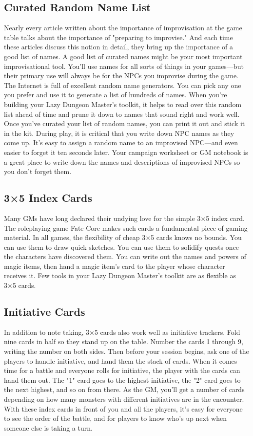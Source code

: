 \documentclass[10pt,a4paper,twoside,bg=print,twocolumn,openany,nodeprecatedcode]{dndbook}
\begin{document}
\subsection{Curated Random Name List}
Nearly every article written about the importance of improvisation at the game table talks about the importance of "preparing to improvise." And each time these articles discuss this notion in detail, they bring up the importance of a good list of names.
A good list of curated names might be your most important improvisational tool.
You'll use names for all sorts of things in your games—but their primary use will always be for the NPCs you improvise during the game. The Internet is full of excellent random name generators. You can pick any one you prefer and use it to generate a list of hundreds of names. When you're building your Lazy Dungeon Master's toolkit, it helps to read over this random list ahead of time and prune it down to names that sound right and work well. Once you've curated your list of random names, you can print it out and stick it in the kit.
During play, it is critical that you write down NPC names as they come up. It's easy to assign a random name to an improvised NPC—and even easier to forget it ten seconds later. Your campaign worksheet or GM notebook is a great place to write down the names and descriptions of improvised NPCs so you don't forget them.
\subsection{3×5 Index Cards}
Many GMs have long declared their undying love for the simple 3×5 index card. The roleplaying game Fate Core makes such cards a fundamental piece of gaming material. In all games, the flexibility of cheap 3×5 cards knows no bounds. You can use them to draw quick sketches. You can use them to solidify quests once the characters have discovered them. You can write out the names and powers of magic items, then hand a magic item's card to the player whose character receives it.
Few tools in your Lazy Dungeon Master's toolkit are as flexible as 3×5 cards.
\subsection{Initiative Cards}
In addition to note taking, 3×5 cards also work well as initiative trackers. Fold nine cards in half so they stand up on the table. Number the cards 1 through 9, writing the number on both sides. Then before your session begins, ask one of the players to handle initiative, and hand them the stack of cards.
When it comes time for a battle and everyone rolls for initiative, the player with the cards can hand them out. The "1" card goes to the highest initiative, the "2" card goes to the next highest, and so on from there. As the GM, you'll get a number of cards depending on how many monsters with different initiatives are in the encounter. With these index cards in front of you and all the players, it's easy for everyone to see the order of the battle, and for players to know who's up next when someone else is taking a turn.
\end{document}
